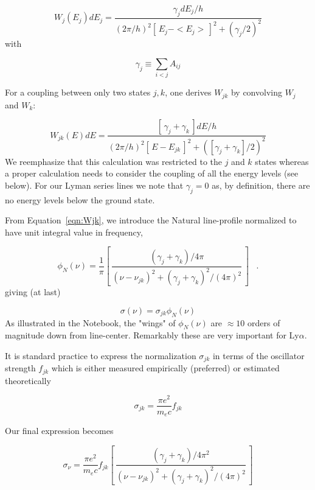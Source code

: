 \documentclass[graybox]{svmult}
\def\lya{Ly$\alpha$}
\def\ltk{\left [ \,}
\def\rtk{\, \right  ] }
\def\perd{\;\;\; .}
\def\smm{\sum\limits}
\begin{document}
\begin{equation}
W_j(E_j) dE_j = \frac{\gamma_j dE_j/h}{(2\pi/h)^2 \ltk E_j - 
<E_j>\rtk^2 + (\gamma_j/2)^2}
\end{equation}
with  

\begin{equation}
\gamma_j \equiv \smm_{i<j} A_{ij}
\end{equation}


For a coupling between only two states $j,k$, one
derives $W_{jk}$ by convolving $W_j$ and $W_k$: 

\begin{equation}
W_{jk}(E) dE = \frac{\ltk \gamma_j + \gamma_k \rtk dE/h}{
(2\pi/h)^2 \ltk E - E_{jk}\rtk^2 + ([\gamma_j + \gamma_k]/2)^2}
\label{eqn:Wjk}
\end{equation}
We reemphasize that this calculation was restricted 
to the $j$ and $k$ states whereas a proper 
calculation needs to consider the coupling of all the 
energy levels (see below).  For our Lyman series lines we
note that $\gamma_j=0$ as, by definition, there are 
no energy levels below the ground state.

From Equation~\ref{eqn:Wjk}, we introduce
the Natural line-profile normalized to have 
unit integral value in frequency,

\begin{equation}
\phi_N(\nu) = \frac{1}{\pi} 
\ltk \frac{(\gamma_j + \gamma_k)/4\pi}{(\nu - \nu_{jk})^2
+ (\gamma_j + \gamma_k)^2 / (4\pi)^2} \rtk \perd
\end{equation}
giving (at last)

\begin{equation}
\sigma(\nu) = \sigma_{jk} \phi_N(\nu)
\end{equation}
As illustrated in the Notebook, 
the "wings" of $\phi_N(\nu)$ are 
$\approx 10$ orders of magnitude down 
from line-center.  Remarkably
these are very important for \lya.

It is standard practice to express the normalization
$\sigma_{jk}$ in terms of the oscillator strength $f_{jk}$
which is either measured empirically (preferred)
or estimated theoretically

\begin{equation}
\sigma_{jk} = \frac{\pi e^2}{m_e c} f_{jk}
\end{equation}

Our final expression becomes

\begin{equation}
\sigma_\nu = \frac{\pi e^2}{m_e c} f_{jk} 
\ltk \frac{(\gamma_j + \gamma_k)/4\pi^2}{(\nu - \nu_{jk})^2
+ (\gamma_j + \gamma_k)^2 / (4\pi)^2} \rtk
\end{equation}
\end{document}
